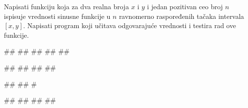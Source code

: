 \begin{Exercise}[label=v1.4_06] 
Napisati funkciju 
koja za dva realna broja $x$ i $y$ i jedan pozitivan ceo broj $n$
ispisuje vrednosti sinusne funkcije u $n$ ravnomerno raspoređenih
tačaka intervala $[x,y]$.  Napisati program koji učitava odgovarajuće 
vrednosti i testira rad ove funkcije.


\begin{miditest}
\begin{upotreba}{1}
#\naslovInt#
##
##
##
##
\end{upotreba}
\end{miditest}
\begin{miditest}
\begin{upotreba}{2}
#\naslovInt#
##
##
##
\end{upotreba}
\end{miditest}

\begin{miditest}
\begin{upotreba}{3}
#\naslovInt#
##
#
\end{upotreba}
\end{miditest}
\begin{miditest}
\begin{upotreba}{1}
#\naslovInt#
##
##
##
\end{upotreba}
\end{miditest}


\end{Exercise}
\ifresenja 
\begin{Answer}[ref=v1.4_06]
\end{Answer} 
\fi



